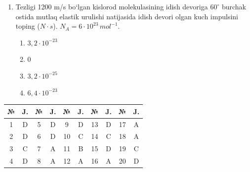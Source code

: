 \begin{enumerate}
\item Tezligi 1200 m/s bo‘lgan kislorod molekulasining idish devoriga $60^\circ$ burchak ostida mutlaq elastik urulishi natijasida idish devori olgan kuch impulsini toping ($N \cdot s$). $N_A = 6 \cdot 10^{23} \, mol^{-1}$.
\begin{enumerate}[label=\Alph*)]
\item $3,2 \cdot 10^{-23}$
\item 0
\item $3,2 \cdot 10^{-25}$
\item $6,4 \cdot 10^{-23}$
\end{enumerate}

\end{enumerate}



\begin{table}[h!]
\centering
\begin{tabular}{|c|c|c|c|c|c|c|c|c|c|}
\hline
№ & J. & № & J. & № & J. & № & J. & № & J. \\ \hline
1 & D & 5 & D & 9 & D & 13 & D & 17 & A \\ \hline
2 & D & 6 & D & 10 & C & 14 & C & 18 & A \\ \hline
3 & C & 7 & A & 11 & B & 15 & D & 19 & C \\ \hline
4 & D & 8 & A & 12 & A & 16 & A & 20 & D \\ \hline
\end{tabular}
\end{table}